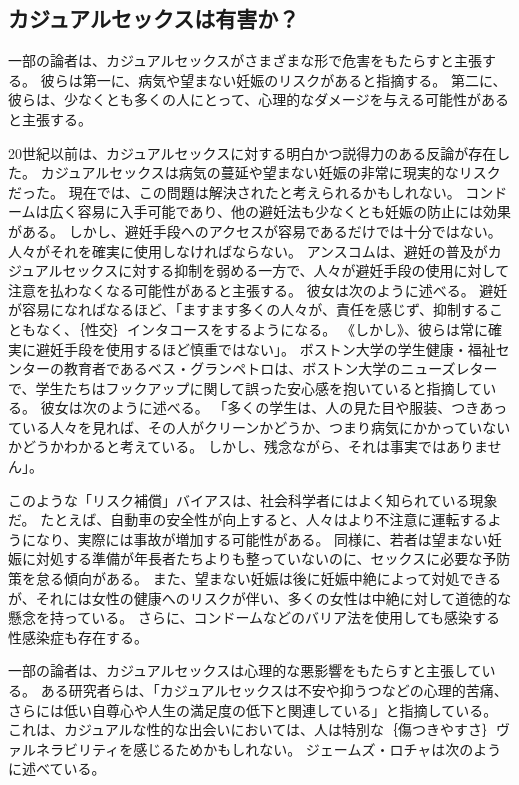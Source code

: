 \documentclass[paper=a4,book,openany]{jlreq}
\begin{document}
\subsection{カジュアルセックスは有害か？}

一部の論者は、カジュアルセックスがさまざまな形で危害をもたらすと主張する。
彼らは第一に、病気や望まない妊娠のリスクがあると指摘する。
第二に、彼らは、少なくとも多くの人にとって、心理的なダメージを与える可能性があると主張する。

20世紀以前は、カジュアルセックスに対する明白かつ説得力のある反論が存在した。
カジュアルセックスは病気の蔓延や望まない妊娠の非常に現実的なリスクだった。
現在では、この問題は解決されたと考えられるかもしれない。
コンドームは広く容易に入手可能であり、他の避妊法も少なくとも妊娠の防止には効果がある。
しかし、避妊手段へのアクセスが容易であるだけでは十分ではない。
人々がそれを確実に使用しなければならない。
アンスコムは、避妊の普及がカジュアルセックスに対する抑制を弱める一方で、人々が避妊手段の使用に対して注意を払わなくなる可能性があると主張する。
彼女は次のように述べる。
避妊が容易になればなるほど、「ますます多くの人々が、責任を感じず、抑制することもなく、｛性交｝{インタコース}をするようになる。
《しかし》、彼らは常に確実に避妊手段を使用するほど慎重ではない」\citep[p.146]{anscombe72contraception}。
ボストン大学の学生健康・福祉センターの教育者であるベス・グランペトロは、ボストン大学のニューズレターで、学生たちはフックアップに関して誤った安心感を抱いていると指摘している。
彼女は次のように述べる。
「多くの学生は、人の見た目や服装、つきあっている人々を見れば、その人がクリーンかどうか、つまり病気にかかっていないかどうかわかると考えている。
しかし、残念ながら、それは事実ではありません」\citep{noa07:_prob_hook_up}。

このような「リスク補償」バイアスは、社会科学者にはよく知られている現象だ。
たとえば、自動車の安全性が向上すると、人々はより不注意に運転するようになり、実際には事故が増加する可能性がある。
同様に、若者は望まない妊娠に対処する準備が年長者たちよりも整っていないのに、セックスに必要な予防策を怠る傾向がある。
また、望まない妊娠は後に妊娠中絶によって対処できるが、それには女性の健康へのリスクが伴い、多くの女性は中絶に対して道徳的な懸念を持っている。
さらに、コンドームなどのバリア法を使用しても感染する性感染症も存在する。

一部の論者は、カジュアルセックスは心理的な悪影響をもたらすと主張している。
ある研究者らは、「カジュアルセックスは不安や抑うつなどの心理的苦痛、さらには低い自尊心や人生の満足度の低下と関連している」と指摘している\citep{napper16:_asses_pers_negat}。
これは、カジュアルな性的な出会いにおいては、人は特別な｛傷つきやすさ｝{ヴァルネラビリティ}を感じるためかもしれない。
ジェームズ・ロチャは次のように述べている。
\end{document}
